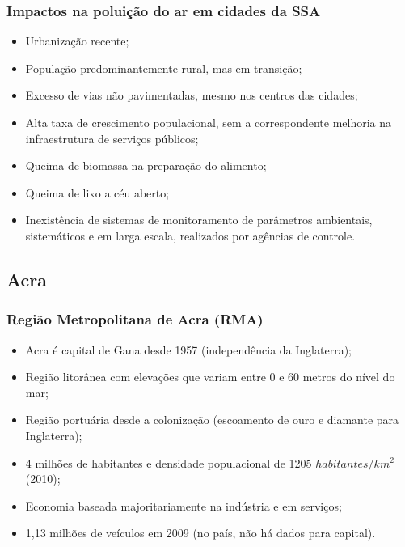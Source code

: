 \begin{frame}
  \frametitle{Impactos na poluição do ar em cidades da SSA}
  \begin{itemize}
    \item Urbanização recente;
    \item População predominantemente rural, mas em transição;
    \item Excesso de vias não pavimentadas, mesmo nos centros das cidades;
    \item Alta taxa de crescimento populacional, sem a correspondente melhoria 
          na infraestrutura de serviços públicos;
    \item Queima de biomassa na preparação do alimento;  
    \item Queima de lixo a céu aberto;
    \item Inexistência de sistemas de monitoramento de parâmetros ambientais, sistemáticos e em larga escala,
        realizados por agências de controle.
  \end{itemize}
\end{frame}

\subsection{Acra}
\begin{frame}
	\frametitle{Região Metropolitana de Acra (RMA)}
	  \begin{itemize}
	  	\item Acra é capital de Gana desde 1957 (independência da Inglaterra);
	  	\item Região litorânea com elevações que variam entre 0 e 60 metros do nível do mar;
	  	\item Região portuária desde a colonização (escoamento de ouro e diamante para Inglaterra);
	  	\item 4 milhões de habitantes e densidade populacional de 1205 $habitantes/km^2$ (2010);
	  	\item Economia baseada majoritariamente na indústria e em serviços;
	  	\item 1,13 milhões de veículos em 2009 (no país, não há dados para capital).   	
	  \end{itemize}
\end{frame}

